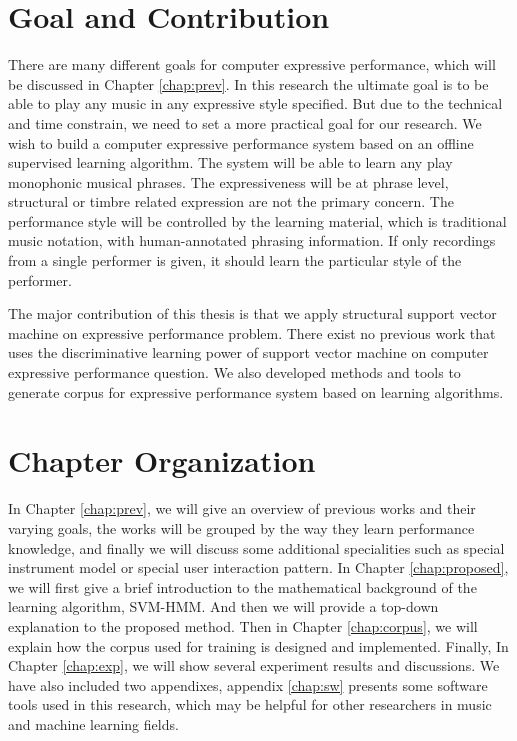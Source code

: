 
%



\section{Goal and Contribution}
There are many different goals for computer expressive performance, which will be discussed in Chapter \ref{chap:prev}. In this research the ultimate goal is to be able to play any music in any expressive style specified. But due to the technical and time constrain, we need to set a more practical goal for our research. We wish to build a computer expressive performance system based on an offline supervised learning algorithm. The system will be able to learn any play monophonic musical phrases. The expressiveness will be at phrase level, structural or timbre related expression are not the primary concern. The performance style will be controlled by the learning material, which is traditional music notation, with human-annotated phrasing information. If only recordings from a single performer is given, it should learn the particular style of the performer.


The major contribution of this thesis is that we apply structural support vector machine on expressive performance problem. There exist no previous work that uses the discriminative learning power of support vector machine on computer expressive performance question. We also developed methods and tools to generate corpus for expressive performance system based on learning algorithms. 
%
%
\section{Chapter Organization}
In Chapter \ref{chap:prev}, we will give an overview of previous works and their varying goals, the works will be grouped by the way they learn performance knowledge, and finally we will discuss some additional specialities such as special instrument model or special user interaction pattern. In Chapter \ref{chap:proposed}, we will first give a brief introduction to the mathematical background of the learning algorithm, SVM-HMM. And then we will provide a top-down explanation to the proposed method. Then in Chapter \ref{chap:corpus}, we will explain how the corpus used for training is designed and implemented. Finally, In Chapter \ref{chap:exp}, we will show several experiment results and discussions. We have also included two appendixes, appendix \ref{chap:sw} presents some software tools used in this research, which may be helpful for other researchers in music and machine learning fields.
